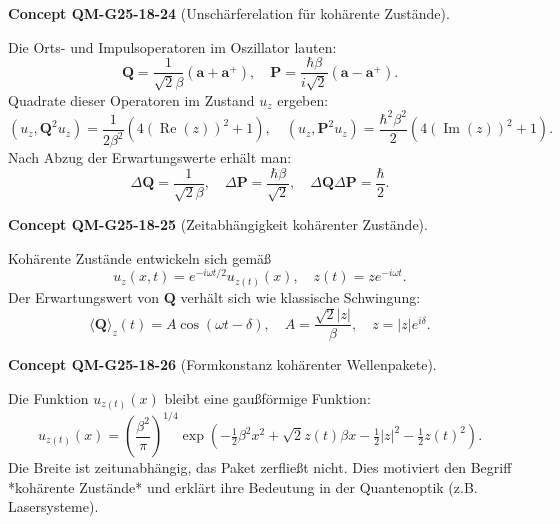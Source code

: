 \documentclass[10pt, letterpaper]{article}
\newcommand{\CustomHeading}[3]{%
  \par\medskip\noindent%
  \textbf{#1 #2} \textnormal{(#3)}.\enskip%
}
\newenvironment{CONC}[2]{\CustomHeading{Concept}{#1}{#2}}{}
\begin{document}
\begin{CONC}{QM-G25-18-24}{Unschärferelation für kohärente Zustände}
Die Orts- und Impulsoperatoren im Oszillator lauten:
\[
\mathbf{Q} = \frac{1}{\sqrt{2}\beta}(\mathbf{a} + \mathbf{a}^+), \quad \mathbf{P} = \frac{\hbar\beta}{i\sqrt{2}}(\mathbf{a} - \mathbf{a}^+).
\]
Quadrate dieser Operatoren im Zustand $u_z$ ergeben:
\[
\left(u_z, \mathbf{Q}^2 u_z \right) = \frac{1}{2\beta^2} \left( 4 (\operatorname{Re}(z))^2 + 1 \right), \quad
\left(u_z, \mathbf{P}^2 u_z \right) = \frac{\hbar^2 \beta^2}{2} \left( 4 (\operatorname{Im}(z))^2 + 1 \right).
\]
Nach Abzug der Erwartungswerte erhält man:
\[
\Delta \mathbf{Q} = \frac{1}{\sqrt{2}\beta}, \quad \Delta \mathbf{P} = \frac{\hbar \beta}{\sqrt{2}}, \quad \Delta \mathbf{Q} \Delta \mathbf{P} = \frac{\hbar}{2}.
\]
\end{CONC}

\begin{CONC}{QM-G25-18-25}{Zeitabhängigkeit kohärenter Zustände}
Kohärente Zustände entwickeln sich gemäß
\[
u_z(x,t) = e^{-i \omega t/2} u_{z(t)}(x), \quad z(t) = z e^{-i \omega t}.
\]
Der Erwartungswert von $\mathbf{Q}$ verhält sich wie klassische Schwingung:
\[
\langle \mathbf{Q} \rangle_z(t) = A \cos(\omega t - \delta), \quad A = \frac{\sqrt{2} |z|}{\beta}, \quad z = |z| e^{i\delta}.
\]
\end{CONC}

\begin{CONC}{QM-G25-18-26}{Formkonstanz kohärenter Wellenpakete}
Die Funktion $u_{z(t)}(x)$ bleibt eine gaußförmige Funktion:
\[
u_{z(t)}(x) = \left( \frac{\beta^2}{\pi} \right)^{1/4} \exp\left( -\tfrac{1}{2} \beta^2 x^2 + \sqrt{2} z(t) \beta x - \tfrac{1}{2}|z|^2 - \tfrac{1}{2} z(t)^2 \right).
\]
Die Breite ist zeitunabhängig, das Paket zerfließt nicht. Dies motiviert den Begriff *kohärente Zustände* und erklärt ihre Bedeutung in der Quantenoptik (z.B. Lasersysteme).
\end{CONC}
\end{document}
